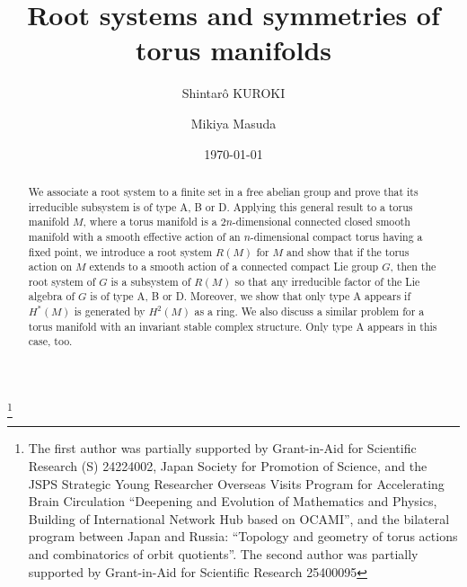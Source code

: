 \documentclass[12pt]{amsart}
\theoremstyle{plain} \numberwithin{equation}{section}
\theoremstyle{definition}
\begin{document}
\title{Root systems and symmetries of torus manifolds}
\author[S. Kuroki]{Shintar\^o KUROKI}
\address{Graduate School of Mathematical Sciences, The University of Tokyo, 3-8-1 Komaba, Meguro-ku, Tokyo, 153-8914, Tokyo, Japan}
\author[M. Masuda]{Mikiya Masuda}
\address{Department of Mathematics, Osaka City
University, Sumiyoshi-ku, Osaka 558-8585, Japan.}

\date{\today}
\thanks{
The first author was partially supported by 
Grant-in-Aid for Scientific Research (S)
24224002, Japan Society for Promotion of Science, and
the JSPS Strategic Young Researcher Overseas Visits Program for Accelerating Brain Circulation
``Deepening and Evolution of Mathematics and Physics, Building of International Network Hub based on OCAMI'',
and the bilateral program between Japan and Russia:
``Topology and geometry of torus actions and combinatorics of orbit quotients''.
The second author was partially supported by Grant-in-Aid for Scientific Research 25400095}

\begin{abstract}
We associate a root system to a finite set in a free abelian group and prove that its irreducible subsystem is of type A, B or D.
Applying this general result to a torus manifold $M$, where a torus manifold is a $2n$-dimensional connected closed smooth manifold with a smooth effective action of an $n$-dimensional compact torus having a fixed point, 
we introduce a root system $R(M)$ for $M$ 
and show that if the torus action on $M$ extends to a smooth action of a connected compact Lie group $G$, then the root system of $G$ is a subsystem of $R(M)$ so that 
any irreducible factor of the Lie algebra of $G$ is of type A, B or D.  
Moreover, we show that only type A appears if $H^*(M)$ is generated by $H^2(M)$ as a ring.
We also discuss a similar problem for a torus manifold with an invariant stable complex structure.  Only type A appears in this case, too.  
\end{abstract}

\maketitle 


\end{document}
